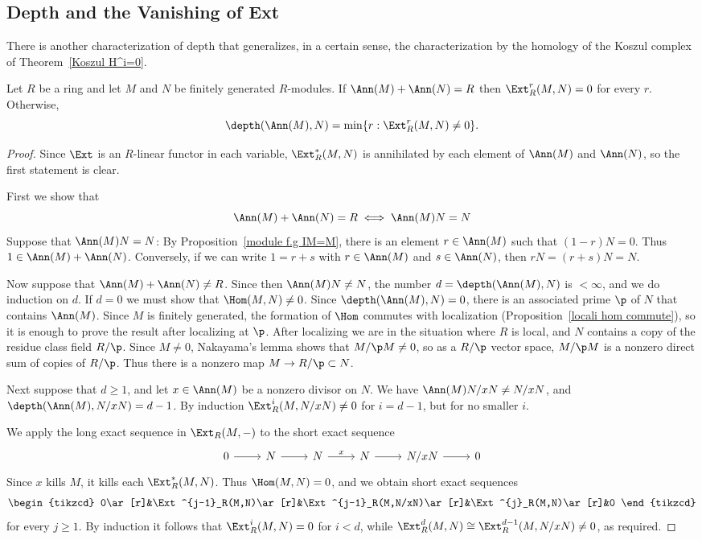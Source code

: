 \subsection{Depth and the Vanishing of Ext}
There is another characterization of depth that generalizes, in a certain
sense, the characterization by the homology of the Koszul complex of Theorem~\ref{Koszul H^i=0}.
\begin{proposition}\label{depth Ext}
Let $R$ be a ring and let $M$ and $N$ be finitely generated $R$-modules. If $\Ann(M)+\Ann(N)=R$ then $\Ext^r_R(M,N)=0$ for every $r$. Otherwise, 
\[\depth(\Ann(M),N)=\min\{r:\Ext^r_R(M,N)\neq 0\}.\]
\end{proposition}
\begin{proof}
Since $\Ext$ is an $R$-linear functor in each variable, $\Ext^*_R(M,N)$ is
annihilated by each element of $\Ann(M)$ and $\Ann(N)$, so the first statement is clear.\par
First we show that 
\[\Ann(M)+\Ann(N)=R\iff \Ann(M)N=N\]
Suppose that $\Ann(M)N=N$: By Proposition~\ref{module f.g IM=M}, there is an element $r\in\Ann(M)$ such that $(1-r)N=0$. Thus $1\in\Ann(M)+\Ann(N)$. Conversely, if we can write $1=r+s$ with $r\in\Ann(M)$ and $s\in\Ann(N)$, then $rN=(r+s)N=N$.\par
Now suppose that $\Ann(M)+\Ann(N)\neq R$. Since then $\Ann(M)N\neq N$, the
number $d=\depth(\Ann(M),N)$ is $<\infty$, and we do induction on $d$. If $d=0$ we must show that $\Hom(M,N)\neq 0$. Since $\depth(\Ann(M),N)=0$, there is an associated prime $\p$ of $N$ that contains $\Ann(M)$. Since $M$ is finitely generated, the formation of $\Hom$ commutes with localization (Proposition~\ref{locali hom commute}), so it is enough to prove the result after localizing at $\p$. After localizing we are in the situation where $R$ is local, and $N$ contains a copy of the residue class field $R/\p$. Since $M\neq0$, Nakayama's lemma shows that $M/\p M\neq 0$, so as a $R/\p$ vector space, $M/\p M$ is a nonzero direct sum of copies of $R/\p$. Thus there is a nonzero map $M\to R/\p\subset N$.\par
Next suppose that $d\geq 1$, and let $x\in\Ann(M)$ be a nonzero divisor on $N$. We have $\Ann(M)N/xN\neq N/xN$, and $\depth(\Ann(M),N/xN)=d-1$. By
induction $\Ext^i_R(M,N/xN)\neq0$ for $i=d-1$, but for no smaller $i$.\par
We apply the long exact sequence in $\Ext_R(M,-)$ to the short exact sequence
\[\begin{tikzcd}
0\ar[r]&N\ar[r]&N\ar[r,"x"]&N\ar[r]&N/xN\ar[r]&0
\end{tikzcd}\]
Since $x$ kills $M$, it kills each $\Ext^*_R(M,N)$. Thus $\Hom(M,N)=0$, and we obtain short exact sequences
\[\begin{tikzcd}
0\ar[r]&\Ext^{j-1}_R(M,N)\ar[r]&\Ext^{j-1}_R(M,N/xN)\ar[r]&\Ext^{j}_R(M,N)\ar[r]&0
\end{tikzcd}\]
for every $j\geq1$. By induction it follows that $\Ext^i_R(M,N)=0$ for $i<d$, while $\Ext^d_R(M,N)\cong\Ext^{d-1}_R(M,N/xN)\neq0$, as required.
\end{proof}
